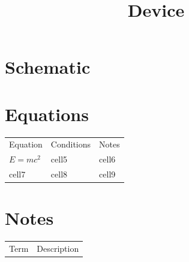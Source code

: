 \documentclass[12pt, letterpaper]{article}
\title{Device}
\author{}
\date{}
\begin{document}
\maketitle

\section*{Schematic}

\section*{Equations}
\begin{tabular}{ l l l }
Equation & Conditions & Notes \\
$E=mc^2$ & cell5 & cell6 \\
cell7 & cell8 & cell9
\end{tabular}

\section*{Notes}
\begin{tabular}{ l l }
Term & Description \\
\end{tabular}
\end{document}
